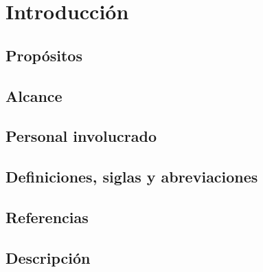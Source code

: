 \chapter{Introducci\'on}
\section{Prop\'ositos}
\section{Alcance}
\section{Personal involucrado}
\section{Definiciones, siglas y abreviaciones}
\section{Referencias}
\section{Descripci\'on}